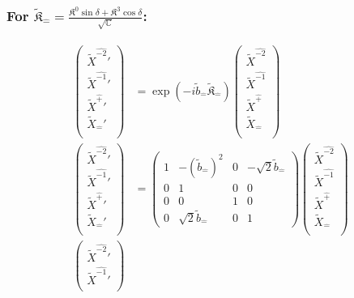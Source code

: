 \documentclass[]{article}
\numberwithin{equation}{section}
\begin{document}
{{\subsubsection{For $\tilde{\mathfrak{K}}_{\hat{-}}=\frac{\mathfrak{K}^0\sin{\delta}+\mathfrak{K}^3\cos{\delta}}{\sqrt{\mathbb{C}}}$:}
\begin{align}
\begin{pmatrix}
    \tilde{X}^{\hat{-2}}'\\
    \tilde{X}^{\hat{-1}}'\\
    \tilde{X}^{\hat{+}}'\\
    \tilde{X}_{\hat{-}}'\\
    \end{pmatrix}&= \exp{(-i\tilde{b}_{\hat{-}}\tilde{\mathfrak{K}}_{\hat{-}})}\begin{pmatrix}
    \tilde{X}^{\hat{-2}}\\
    \tilde{X}^{\hat{-1}}\\
    \tilde{X}^{\hat{+}}\\
    \tilde{X}_{\hat{-}}\\
    \end{pmatrix}\\
    \begin{pmatrix}
    \tilde{X}^{\hat{-2}}'\\
    \tilde{X}^{\hat{-1}}'\\
    \tilde{X}^{\hat{+}}'\\
    \tilde{X}_{\hat{-}}'\\
    \end{pmatrix}&= \begin{pmatrix}
        1&-(\tilde{b}_{\hat{-}})^2&0&-\sqrt{2}\tilde{b}_{\hat{-}}\\
        0&1&0&0\\
        0&0&1&0\\
        0&\sqrt{2}\tilde{b}_{\hat{-}}&0&1
    \end{pmatrix}\begin{pmatrix}
    \tilde{X}^{\hat{-2}}\\
    \tilde{X}^{\hat{-1}}\\
    \tilde{X}^{\hat{+}}\\
    \tilde{X}_{\hat{-}}\\
    \end{pmatrix}\\
    \begin{pmatrix}
    \tilde{X}^{\hat{-2}}'\\
    \tilde{X}^{\hat{-1}}'\\

\end{pmatrix}
\end{align}}}
\end{document}
